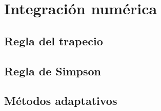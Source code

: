 \section{Integración numérica}
\subsection{Regla del trapecio}
\subsection{Regla de Simpson}
\subsection{Métodos adaptativos}
